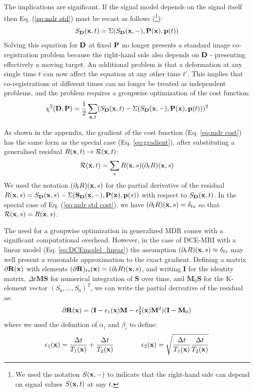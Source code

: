 \documentclass[num-refs]{wiley-article}
\newcommand{\x}{{\bf x}}
\newcommand{\D}{{\bf D}}
\newcommand{\Pb}{{\bf P}}
\newcommand{\pb}{{\bf p}}
\newcommand{\Sb}{{\bf S}}
\begin{document}
The implications are significant. If the signal model depends on the signal itself then Eq. (\ref{eq:mdr std}) must be recast as follows (\footnote{We used the notation $S(\x,-)$ to indicate that the right-hand side can depend on signal values $S(\x,t)$ at any $t$.}):
\begin{equation}\label{eq:mdr}
S_\D(\x, t) = \Sigma(S_\D(\x,-),\Pb(\x), \pb (t))  
\end{equation}
Solving this equation for $\D$ at fixed $\Pb$ no longer presents a standard image co-registration problem because the right-hand side also depends on $\D$ - presenting effectively a moving target. An additional problem is that a deformation at any single time $t$ can now affect the equation at any other time $t'$. This implies that co-registrations at different times can no longer be treated as independent problems, and the problem requires a groupwise optimization of the cost function:
\begin{equation}\label{eq:mdr cost}
\chi^2(\D,\Pb)=\frac{1}{2}\sum_{\x, t}(S_\D(\x, t) - \Sigma(S_\D(\x,-),\Pb(\x), \pb (t)) )^2 
\end{equation}

As shown in the appendix, the gradient of the cost function (Eq. \ref{eq:mdr cost}) has the same form as the special case (Eq. \ref{eq:gradient}), after substituting a generalised residual $R(\x, t)\to {\cal R}(\x, t)$:
\begin{equation}\label{eq:gen res}
{\cal R}(\x, t) = \sum_s R(\x, s) (\partial_t R)(\x,s)
\end{equation}
We used the notation $(\partial_t R)(\x,s)$ for the partial derivative of the residual $R(\x, s)= S_\D(\x, s) - \Sigma(\Sb_\D(\x,-),\Pb(\x), \pb (s))$ with respect to $S_\D(\x, t)$. In the special case of Eq. (\ref{eq:mdr std cost}), we have $(\partial_t R)(\x,s)=\delta_{ts}$ so that ${\cal R}(\x, s)=R(\x, s)$. 

The need for a groupwise optimization in generalized MDR comes with a significant computational overhead. However, in the case of DCE-MRI with a linear model (Eq. \ref{eq:DCEmodel_linear}) the assumption $(\partial_t R)(\x,s)\approx\delta_{ts}$ may well present a reasonable approximation to the exact gradient. Defining a matrix $\partial {\mathbf R}(\x)$ with elements $(\partial {\mathbf R})_{ts}(\x)=(\partial_t R)(\x,s)$, and writing ${\mathbf I}$ for the identity matrix, $\Delta t{\mathbf M} {\mathbf S}$ for numerical integration of ${\mathbf S}$ over time, and ${\mathbf M}_0 {\mathbf S} $ for the K-element vector $(S_0,...,S_0)^T$, we can write the partial derivative of the residual as:
\begin{eqnarray}
\label{eq:DCEmodel_linear discrete}
\partial {\mathbf R}(\x)  = ({\mathbf I}-\epsilon_1(\x) {\mathbf M}-\epsilon_2^2(\x) {\mathbf M}^2)({\mathbf I}-{\mathbf M}_0)
\end{eqnarray}
where we used the definition of $\alpha_i$ and $\beta_i$ \cite{Flouri2016} to define:
\begin{eqnarray}
\epsilon_1(\x) = \frac{\Delta t}{T_1(\x)} + \frac{\Delta t}{T_2(\x)}
\qquad\qquad
\epsilon_2(\x) = \sqrt{\frac{\Delta t}{T_1(\x)} \frac{\Delta t}{T_2(\x)}}
\end{eqnarray}
\end{document}
